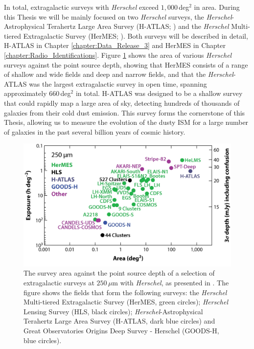 In total, extragalactic surveys with \textit{Herschel} exceed $1,000\,$deg$^2$ in area. During this Thesis we will be mainly focused on two \textit{Herschel} surveys, the \textit{Herschel}-Astrophysical Terahertz Large Area Survey (H-ATLAS; \citealt{Eales_2010}) and the \textit{Herschel} Multi-tiered Extragalactic Survey (HerMES; \citealt{Oliver_2012}). Both surveys will be described in detail, H-ATLAS in Chapter \ref{chapter:Data_Release_3} and HerMES in Chapter \ref{chapter:Radio_Identifications}. Figure \ref{fig:herschel_surveys} shows the area of various \textit{Herschel} surveys against the point source depth, showing that HerMES consists of a range of shallow and wide fields and deep and narrow fields, and that the \textit{Herschel}-ATLAS was the largest extragalactic survey in open time, spanning approximately $660\,$deg$^2$ in total. H-ATLAS was designed to be a shallow survey that could rapidly map a large area of sky, detecting hundreds of thousands of galaxies from their cold dust emission. This survey forms the cornerstone of this Thesis, allowing us to measure the evolution of the dusty ISM for a large number of galaxies in the past several billion years of cosmic history.

\begin{figure}
    \centering
	\includegraphics[width=0.9\columnwidth]{Figures/herschel_surveys.pdf}
	\caption[Survey area against point source depth for extragalactic \textit{Herschel} surveys]{The survey area against the point source depth of a selection of extragalactic surveys at $250\,\mu$m with \textit{Herschel}, as presented in \citealt{Lutz_2014}. The figure shows the fields that form the following surveys: the \textit{Herschel} Multi-tiered Extragalactic Survey (HerMES, green circles); \textit{Herschel} Lensing Survey (HLS, black circles); \textit{Herschel}-Astrophysical Terahertz Large Area Survey (H-ATLAS, dark blue circles) and Great Observatories Origins Deep Survey - Herschel (GOODS-H, blue circles).}
	\label{fig:herschel_surveys}
\end{figure}

